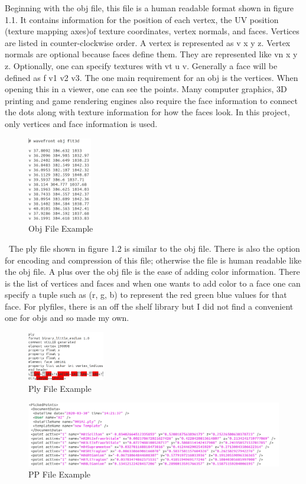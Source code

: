 Beginning with the obj file, this file is a human readable format shown in figure 1.1. It contains information for the position of each vertex, the UV position (texture mapping axes)of texture coordinates, vertex normals, and faces. Vertices are listed in counter-clockwise order. A vertex is represented as v x y z. Vertex normals are optional because faces define them. They are represented like vn x y z. Optionally, one can specify textures with vt u v. Generally a face will be defined as f v1 v2 v3. The one main requirement for an obj is the vertices. When opening this in a viewer, one can see the points. Many computer graphics, 3D printing and game rendering engines also require the face information to connect the dots along with texture information for how the faces look. In this project, only vertices and face information is used.
\begin{figure}[!htb]
	\caption{Obj File Example}
	\centering
	\includegraphics[width=0.25\textwidth]{images/obj_file.png}
\end{figure}
\
The ply file shown in figure 1.2 is similar to the obj file. There is also the option for encoding and compression of this file; otherwise the file is human readable like the obj file. A plus over the obj file is the ease of adding color information. There is the list of vertices and faces and when one wants to add color to a face one can specify a tuple such as (r, g, b) to represent the red green blue values for that face. For plyfiles, there is an off the shelf library but I did not find a convenient one for objs and so made my own. 

\begin{figure}[!htb]
	\caption{Ply File Example}
	\centering
	\includegraphics[width=0.3\textwidth]{images/ply_file.png}
\end{figure}
\begin{figure}[!htb]
	\caption{PP File Example}
	\centering
	\includegraphics[width=1.1\textwidth]{images/pp_file.png}
\end{figure}

